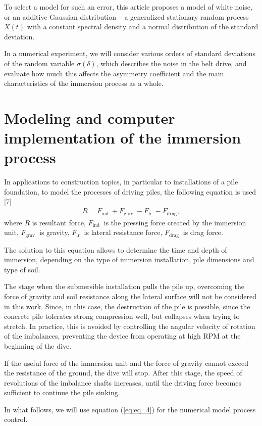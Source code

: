 \documentclass[
11pt,%
tightenlines,%
twoside,%
onecolumn,%
nofloats,%
nobibnotes,%
nofootinbib,%
superscriptaddress,%
noshowpacs,%
centertags]%
{revtex4}
\begin{document}
To select a model for such an error,  this article proposes a model
of white noise, or an additive Gaussian distribution -- a
generalized stationary random process $X(t)$ with a constant
spectral density and a normal distribution of the standard
deviation.

In a numerical experiment, we will consider  various orders of
standard deviations of the random variable $\sigma(\delta)$, which
describes the noise in the belt drive, and evaluate how much this
affects the asymmetry coefficient and the main characteristics of
the immersion process as a whole.

\section{Modeling and computer implementation of the immersion process}
In applications to construction topics, in particular  to
installations of a pile foundation, to model the processes of
driving piles, the following equation is used [7]
\begin{eqnarray}
R=F_{\text {ind }}+F_{\text {grav }}-F_{\text {lr }}-F_{\text
{drag}}, \label{eq:eq_4}
\end{eqnarray}
where $R$ is resultant force, $F_{\text {ind }}$ is the pressing
force created by the immersion unit, $F_{\text {grav }}$ is gravity,
$F_{\text {lr }}$ is lateral resistance force, $F_{\text {drag }}$
is drag force.

The solution to this equation allows to determine the  time and
depth of immersion, depending on the type of immersion installation,
pile dimensions and type of soil.

The stage when the submersible installation  pulls the pile up,
overcoming the force of gravity and soil resistance along the
lateral surface will not be considered in this work. Since, in this
case, the destruction of the pile is possible, since the concrete
pile tolerates strong compression well, but collapses when trying to
stretch. In practice, this is avoided by controlling the angular
velocity of rotation of the imbalances, preventing the device from
operating at high RPM at the beginning of the dive.

If the useful force of the immersion unit and the  force of gravity
cannot exceed the resistance of the ground, the dive will stop.
After this stage, the speed of revolutions of the imbalance shafts
increases, until the driving force becomes sufficient to continue
the pile sinking.

In what follows, we will use equation (\ref{eq:eq_4})  for the
numerical model process control.
\end{document}
